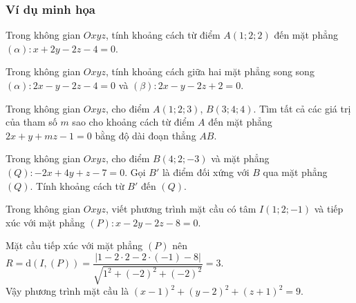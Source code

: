 \subsubsection{Ví dụ minh họa}
\setcounter{subsubsection}{0}
\setcounter{vd}{0}
\setcounter{bt}{0}
\setcounter{ex}{0}
\begin{vd} %
	Trong không gian $Oxyz$, tính  khoảng cách từ điểm $A(1;2;2)$ đến mặt phẳng $(\alpha)\colon x+2y-2z-4=0$.

\end{vd}
\begin{vd} %
	Trong không gian $Oxyz$, tính khoảng cách giữa hai mặt phẳng song song $(\alpha)\colon 2x-y-2z-4=0$ và $(\beta)\colon 2x-y-2z+2=0$.
\end{vd}
\begin{vd}%
	Trong không gian $Oxyz$, cho  điểm $A(1;2;3)$, $B(3;4;4)$. Tìm tất cả các giá trị của tham số $m$ sao cho khoảng cách từ điểm $A$ đến mặt phẳng $2x+y+mz-1=0$ bằng độ dài đoạn thẳng $AB$.
	
\end{vd}
\begin{vd}%
	Trong không gian $Oxyz$, cho điểm $B(4;2;-3)$ và mặt phẳng $(Q):-2x+4y+z-7=0$. Gọi $B'$ là điểm đối xứng với $B$ qua mặt phẳng $(Q)$. Tính khoảng cách từ $B'$ đến $(Q)$.
\end{vd}
\begin{vd}%
	Trong không gian $Oxyz$, viết phương trình mặt cầu có tâm $I(1; 2; -1)$ và tiếp xúc với mặt phẳng $(P)\colon x-2y-2z-8=0$.

	\loigiai
	{Mặt cầu tiếp xúc với mặt phẳng $(P)$ nên  $R=\mathrm{d}\left(I, (P)\right)=\dfrac{|1-2\cdot 2-2\cdot (-1)-8|}{\sqrt{1^2+(-2)^2+(-2)^2}}=3$.\\
		Vậy	phương trình mặt cầu là $(x - 1)^2 + (y - 2)^2 + (z + 1)^2= 9$.
	}
\end{vd}
